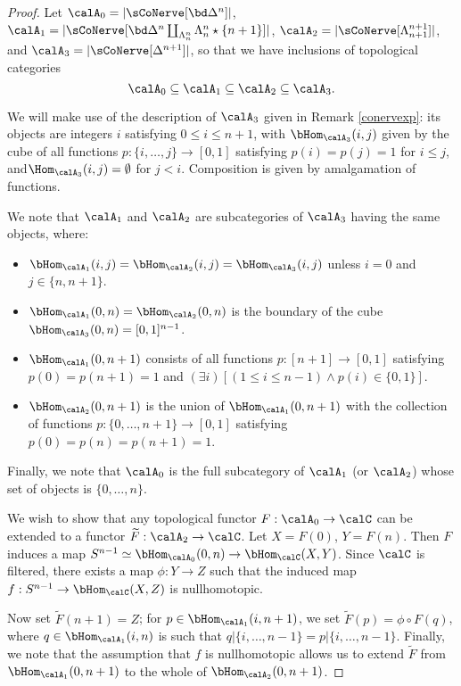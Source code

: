 \begin{proof}
Let $\calA_0 = | \sCoNerve[\bd \Delta^n] |$, $\calA_1 = | \sCoNerve[ \bd \Delta^n \coprod_{ \Lambda^n_n}  \Lambda^n_n \star \{ n+1 \}]|$, $\calA_2 = | \sCoNerve[ \Lambda^{n+1}_{n+1}] |$, and
$\calA_3 = | \sCoNerve[ \Delta^{n+1}] |$, so that we have inclusions of topological categories
$$ \calA_0 \subseteq \calA_1 \subseteq \calA_2 \subseteq \calA_3.$$

We will make use of the description of $\calA_3$ given in Remark \ref{conervexp}: its objects are integers $i$ satisfying $0 \leq i \leq n+1$, with $\bHom_{\calA_3}(i,j)$ given by the cube of all functions $p: \{i, \ldots, j\} \rightarrow [0,1]$ satisfying $p(i)=p(j)=1$ for $i \leq j$, and$\Hom_{\calA_3}(i,j) = \emptyset$ for $j < i$. Composition is given by amalgamation of functions.

We note that $\calA_1$ and $\calA_2$ are subcategories of $\calA_3$ having the same objects, where:
\begin{itemize}
\item $\bHom_{\calA_1}(i,j) = \bHom_{\calA_2}(i,j) = \bHom_{\calA_3}(i,j)$ unless $i=0$ and
$j \in \{n,n+1\}$. 

\item $\bHom_{\calA_1}(0,n) = \bHom_{\calA_2}(0,n)$ is the boundary of the cube $\bHom_{\calA_3}(0,n) = [0,1]^{n-1}$.

\item $\bHom_{\calA_1}(0,n+1)$ consists of all functions $p: [n+1] \rightarrow [0,1]$
satisfying $p(0) = p(n+1) =1$ and $(\exists i) [ (1 \leq i \leq n-1) \wedge p(i) \in \{0,1\} ]$.

\item $\bHom_{\calA_2}(0,n+1)$ is the union of $\bHom_{\calA_1}(0,n+1)$ with the collection
of functions $p: \{0, \ldots, n+1\} \rightarrow [0,1]$ satisfying $p(0) = p(n) = p(n+1) = 1$.
\end{itemize}

Finally, we note that $\calA_0$ is the full subcategory of $\calA_1$ (or $\calA_2$) whose set of objects is $\{0, \ldots, n\}$.

We wish to show that any topological functor $F: \calA_0 \rightarrow \calC$ can be extended to a 
functor $\widetilde{F}: \calA_2 \rightarrow \calC$. Let $X = F(0)$, $Y = F(n)$. Then $F$ induces a map $S^{n-1} \simeq \bHom_{\calA_0}(0,n) \rightarrow \bHom_{\calC}(X,Y)$. Since $\calC$ is filtered, there exists a map $\phi: Y \rightarrow Z$ such that the induced map
$f: S^{n-1} \rightarrow \bHom_{\calC}(X,Z)$ is nullhomotopic.

Now set $\widetilde{F}(n+1) = Z$; for $p \in \bHom_{\calA_1}(i, n+1)$, we set
$\widetilde{F}(p) = \phi \circ F(q)$, where $q \in \bHom_{\calA_1}(i,n)$ is such that
$q| \{i, \ldots, n-1 \} = p | \{i, \ldots, n-1\}$. Finally, we note that the assumption that
$f$ is nullhomotopic allows us to extend $\widetilde{F}$ from $\bHom_{\calA_1}(0,n+1)$ to the
whole of $\bHom_{\calA_2}(0,n+1)$.
\end{proof}

